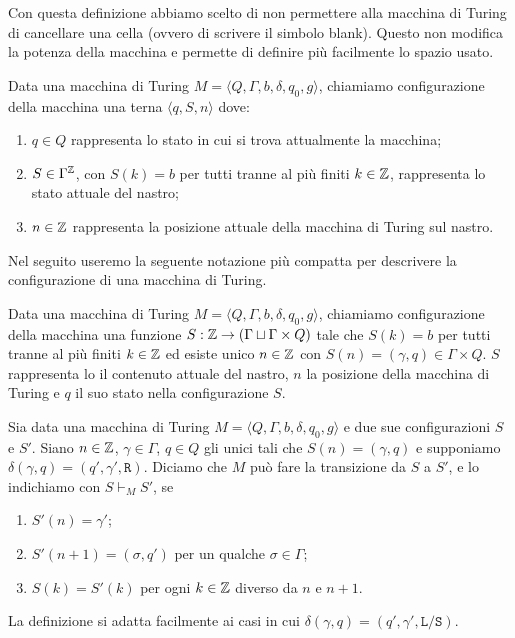 \begin{osservazione}
 Con questa definizione abbiamo scelto di non permettere alla macchina di Turing
 di cancellare una cella (ovvero di scrivere il simbolo blank).
 Questo non modifica la potenza della macchina e permette di definire più facilmente
 lo spazio usato.
\end{osservazione}


\begin{definizione}
 Data una macchina di Turing $M=\langle Q, \Gamma, b, \delta, q_0, g \rangle$,
 chiamiamo configurazione della macchina una terna
 $\langle q, S, n \rangle$ dove:
 \begin{enumerate}
  \item $q \in Q$ rappresenta lo stato in cui si trova attualmente la macchina;
  \item $S \in \Gamma ^ {\mathbb{Z}}$, con $S(k)=b$ per tutti tranne al più finiti $k \in \mathbb{Z}$,
  rappresenta lo stato attuale del nastro;
  \item $n \in \mathbb{Z}$ rappresenta la posizione attuale della macchina di Turing
  sul nastro.
 \end{enumerate}
\end{definizione}
Nel seguito useremo la seguente notazione più compatta per descrivere la
configurazione di una macchina di Turing.
\begin{definizione}
\label{def:conf-TM}
 Data una macchina di Turing $M=\langle Q, \Gamma, b, \delta, q_0, g \rangle$,
 chiamiamo configurazione della macchina una funzione
 $S: \mathbb{Z} \to (\Gamma \sqcup \Gamma \times Q)$  tale che $S(k)=b$ per
 tutti tranne al più finiti $k \in \mathbb{Z}$ ed esiste unico $n \in \mathbb{Z}$ con
 $S(n) = (\gamma, q) \in \Gamma \times Q$.
 $S$ rappresenta lo il contenuto attuale del nastro, $n$ la posizione della
 macchina di Turing e $q$ il suo stato nella configurazione $S$.
\end{definizione}

\begin{definizione}
 Sia data una macchina di Turing $M=\langle Q, \Gamma, b, \delta, q_0, g \rangle$
 e due sue configurazioni $S$ e $S'$.
 Siano $n \in \mathbb{Z}$, $\gamma \in \Gamma$, $q \in Q$ gli unici tali che
 $S(n) = (\gamma, q)$ e supponiamo $\delta(\gamma, q) = (q', \gamma', \texttt{R})$.
 Diciamo che
 $M$ può fare la transizione da $S$ a $S'$, e lo indichiamo con $S \vdash_M S'$,
 se 
 \begin{enumerate}
  \item $S'(n)=\gamma'$;
  \item $S'(n+1)=(\sigma, q')$ per un
 qualche $\sigma \in \Gamma$;
  \item $S(k) = S'(k)$ per ogni $k \in \mathbb{Z}$ diverso da
 $n$ e $n+1$.
 \end{enumerate}
 La definizione si adatta facilmente ai casi in cui
 $\delta(\gamma, q) = (q', \gamma', \texttt{L}/\texttt{S})$.
\end{definizione}

